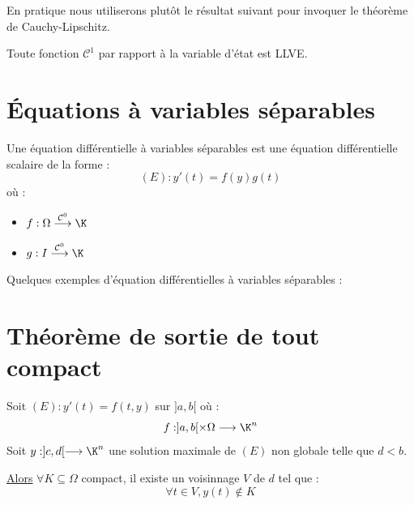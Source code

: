 En pratique nous utiliserons plutôt le résultat suivant pour invoquer le théorème de Cauchy-Lipschitz. 

\begin{proposition}
    Toute fonction $ \mathcal{C}^1$ par rapport à la variable d'état est LLVE. 
\end{proposition}



\newpage

\section{Équations à variables séparables}

\begin{definition}
    Une équation différentielle à variables séparables est une équation différentielle scalaire de la forme : 
        \[ (E) : y'(t) = f(y)g(t) \] 
    où : 
    \begin{itemize}
        \item $f : \Omega \overset{ \mathcal{C}^0}{\longrightarrow} \K $
        \item $g : I \overset{ \mathcal{C}^0}{\longrightarrow} \K $ 
    \end{itemize}
\end{definition}

\begin{example}
    Quelques exemples d'équation différentielles à variables séparables : 

\end{example}



\section{Théorème de sortie de tout compact}

\begin{theorem}
    Soit $(E) : y'(t) = f(t,y)$ sur $]a,b[$ où : 
        \[ f : ]a,b[ \times \Omega \longrightarrow \K^n \] 
    Soit $y : ]c,d[ \longrightarrow \K^n$ une solution maximale de $(E)$ non globale telle que $d < b$. 

    \underline{Alors} $ \forall K \subseteq \Omega$ compact, il existe un voisinnage $V$ de $d$ tel que : 
        \[ \forall t \in V, y(t) \not \in K \] 
\end{theorem}

